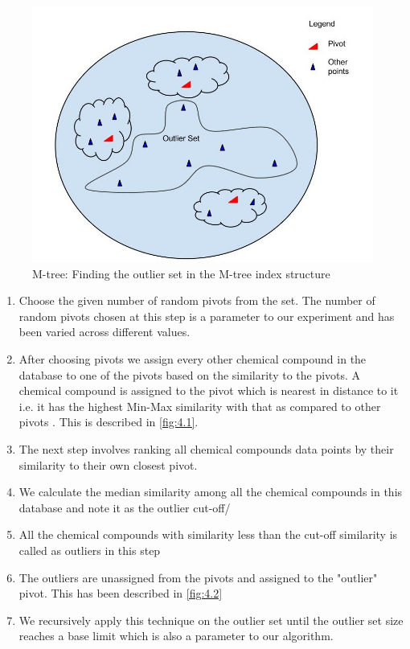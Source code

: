 \begin{figure}[ht]	
\centering
\includegraphics[width=0.7 \columnwidth]{img/image0b.jpg}
\caption{M-tree: Finding the outlier set in the M-tree index structure}
\label{fig:4.2}
\end{figure}
\begin{enumerate}

\item Choose the given number of random pivots from the set. The number of random pivots chosen at this step is a parameter to our experiment and has been varied across different values.

\item After choosing pivots we assign every other chemical compound in the database to one of the pivots based on the similarity to the pivots. A chemical compound is assigned to the pivot which is nearest in distance to it i.e. it has the highest Min-Max similarity with that as compared to other pivots . This is described in \autoref{fig:4.1}.

\item The next step involves ranking all chemical compounds data points by their similarity to their own closest pivot. 

\item We calculate the median similarity among all the chemical compounds in this database and note it as the outlier cut-off/

\item All the chemical compounds with similarity less than the cut-off similarity is called as outliers in this step

\item The outliers are unassigned from the pivots and assigned to the "outlier" pivot. This has been described in \autoref{fig:4.2}

\item We recursively apply this technique on the outlier set until the outlier set size reaches a base limit which is also a parameter to our algorithm.\\

\end{enumerate}


